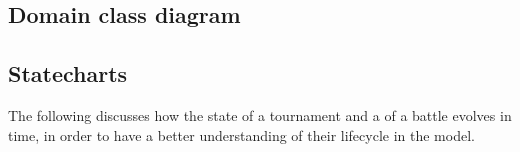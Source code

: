 \subsection{Domain class diagram}
\begin{adjustbox}{
		max size={\textwidth}{},
		caption={Domain class diagram},
		label={fig:Domain class diagram},
		figure=H}
	\centering
\end{adjustbox}
\pagebreak

\subsection{Statecharts}

The following discusses how the state of a tournament and a of a battle
evolves in time, in order to have a better understanding of their lifecycle
in the model.

